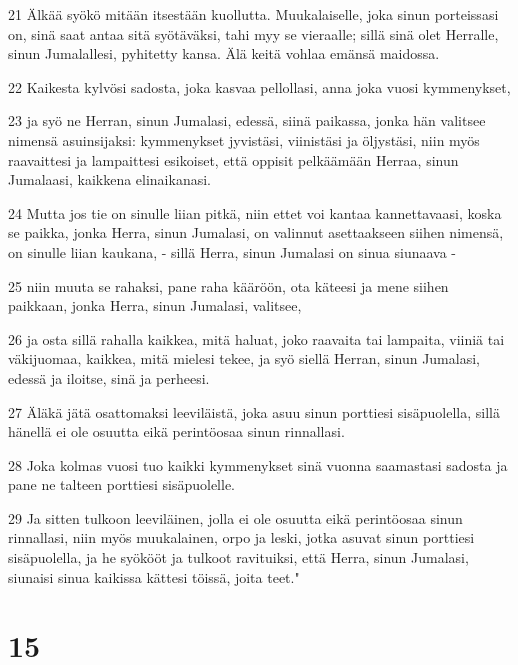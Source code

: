 \par 21 Älkää syökö mitään itsestään kuollutta. Muukalaiselle, joka sinun porteissasi on, sinä saat antaa sitä syötäväksi, tahi myy se vieraalle; sillä sinä olet Herralle, sinun Jumalallesi, pyhitetty kansa. Älä keitä vohlaa emänsä maidossa.
\par 22 Kaikesta kylvösi sadosta, joka kasvaa pellollasi, anna joka vuosi kymmenykset,
\par 23 ja syö ne Herran, sinun Jumalasi, edessä, siinä paikassa, jonka hän valitsee nimensä asuinsijaksi: kymmenykset jyvistäsi, viinistäsi ja öljystäsi, niin myös raavaittesi ja lampaittesi esikoiset, että oppisit pelkäämään Herraa, sinun Jumalaasi, kaikkena elinaikanasi.
\par 24 Mutta jos tie on sinulle liian pitkä, niin ettet voi kantaa kannettavaasi, koska se paikka, jonka Herra, sinun Jumalasi, on valinnut asettaakseen siihen nimensä, on sinulle liian kaukana, - sillä Herra, sinun Jumalasi on sinua siunaava -
\par 25 niin muuta se rahaksi, pane raha kääröön, ota käteesi ja mene siihen paikkaan, jonka Herra, sinun Jumalasi, valitsee,
\par 26 ja osta sillä rahalla kaikkea, mitä haluat, joko raavaita tai lampaita, viiniä tai väkijuomaa, kaikkea, mitä mielesi tekee, ja syö siellä Herran, sinun Jumalasi, edessä ja iloitse, sinä ja perheesi.
\par 27 Äläkä jätä osattomaksi leeviläistä, joka asuu sinun porttiesi sisäpuolella, sillä hänellä ei ole osuutta eikä perintöosaa sinun rinnallasi.
\par 28 Joka kolmas vuosi tuo kaikki kymmenykset sinä vuonna saamastasi sadosta ja pane ne talteen porttiesi sisäpuolelle.
\par 29 Ja sitten tulkoon leeviläinen, jolla ei ole osuutta eikä perintöosaa sinun rinnallasi, niin myös muukalainen, orpo ja leski, jotka asuvat sinun porttiesi sisäpuolella, ja he syökööt ja tulkoot ravituiksi, että Herra, sinun Jumalasi, siunaisi sinua kaikissa kättesi töissä, joita teet."

\chapter{15}

